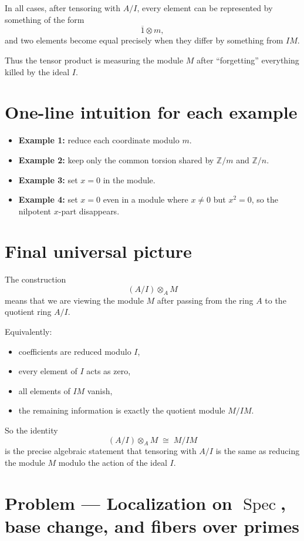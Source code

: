 \documentclass[12pt,a4paper]{article}
\DeclareMathOperator{\Spec}{Spec}
\theoremstyle{plain}
\theoremstyle{definition}      %
\begin{document}
	In all cases, after tensoring with \(A/I\), every element can be represented by something of the form
	\[
	\overline{1}\otimes m,
	\]
	and two elements become equal precisely when they differ by something from \(IM\).
	
	Thus the tensor product is measuring the module \(M\) after ``forgetting'' everything killed by the ideal \(I\).
	
	\section{One-line intuition for each example}
	
	\begin{itemize}
		\item \textbf{Example 1:} reduce each coordinate modulo \(m\).
		\item \textbf{Example 2:} keep only the common torsion shared by \(\mathbb Z/m\) and \(\mathbb Z/n\).
		\item \textbf{Example 3:} set \(x=0\) in the module.
		\item \textbf{Example 4:} set \(x=0\) even in a module where \(x\neq 0\) but \(x^2=0\), so the nilpotent \(x\)-part disappears.
	\end{itemize}
	
	\section{Final universal picture}
	
	The construction
	\[
	(A/I)\otimes_A M
	\]
	means that we are viewing the module \(M\) after passing from the ring \(A\) to the quotient ring \(A/I\).
	
	Equivalently:
	\begin{itemize}
		\item coefficients are reduced modulo \(I\),
		\item every element of \(I\) acts as zero,
		\item all elements of \(IM\) vanish,
		\item the remaining information is exactly the quotient module \(M/IM\).
	\end{itemize}
	
	So the identity
	\[
	(A/I)\otimes_A M \;\cong\; M/IM
	\]
	is the precise algebraic statement that tensoring with \(A/I\) is the same as reducing the module \(M\) modulo the action of the ideal \(I\).
	
	
	\section*{Problem — Localization on $\Spec$, base change, and fibers over primes}
	
\end{document}

